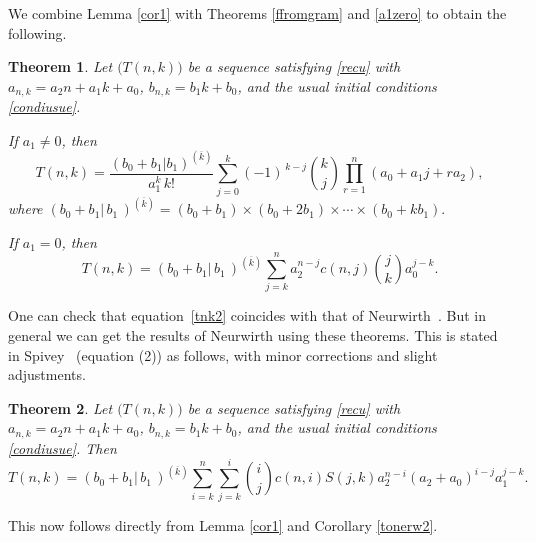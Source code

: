 \documentclass[12pt,a4paper]{article}
\newtheorem{theorem}{Theorem}[section]
\theoremstyle{definition} %
\theoremstyle{remark}
\theoremstyle{examples}
\newcommand{\suit}[1]{{#1}(n,k)}
\newcommand{\coul}[1]{#1_{n,k}}
\newcommand{\argtgen}[3]{(#1|#2)^{(\overline{#3})}}
\newcommand{\coss}{\cdots}
\begin{document}
We combine Lemma \ref{cor1} with Theorems \ref{ffromgram} and \ref{a1zero} to obtain the following.
\begin{theorem}
	Let $\big(\suit{T}\big)$ be a sequence satisfying \eqref{recu} with $\coul{a} = a_2 n + a_1 k + a_0$, $\coul{b} = b_1k+b_0$, and the usual initial conditions \eqref{condiusue}. 
	
	If $a_1 \neq 0$, then
	\begin{equation}\label{tnkn}
	\suit{T} = \frac{\argtgen{b_0+b_1}{b_1}{k}}{a_1^k\, k!} \sum_{j=0}^{k} (-1)^{\,k-j} \binom{k}{j} \prod_{r=1}^{n} (a_0 + a_1 j + r a_2),
	\end{equation} where $\argtgen{b_0 + b_1}{\, b_1 \,}{k}=(b_0 + b_1) \times (b_0 + 2b_1) \times \coss \times (b_0 + k b_1). $
	
	If $a_1=0$, then 
	\begin{equation}\label{tnk2}
	T(n,k)=\argtgen{b_0 + b_1}{\, b_1 \,}{k}\sum_{j=k}^na_2^{n-j}c(n,j){j\choose k}a_0^{j-k}.
	\end{equation}
\end{theorem}
\noindent
One can check that equation~\eqref{tnk2} coincides with that of Neurwirth~\cite{neuwirth2001}. But in general we can get the results of Neurwirth using these theorems. This is stated in Spivey~\cite{Spivey2011JIS} (equation (2)) as follows, with minor corrections and slight adjustments.
\begin{theorem}
	Let $\big(\suit{T}\big)$ be a sequence satisfying \eqref{recu} with $\coul{a} = a_2 n + a_1 k + a_0$, $\coul{b} = b_1k+b_0$, and the usual initial conditions \eqref{condiusue}. Then
	\begin{equation}
		T(n,k)=\argtgen{b_0 + b_1}{\, b_1 \,}{k} 	\sum_{i=k}^{n}\sum_{j=k}^{i}
		\binom{i}{j} c(n,i) S(j,k)
		a_2^{n-i}
		(a_2+a_0)^{i-j}
		a_1^{j-k}.
	\end{equation}
\end{theorem}
\noindent This now follows directly from Lemma \ref{cor1} and Corollary \ref{tonerw2}.
	
\end{document}
